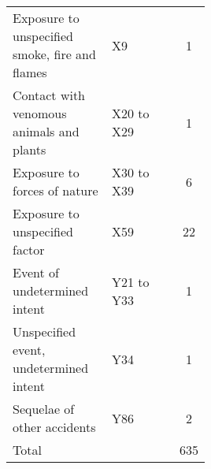 \documentclass[]{article}
\begin{document}
\begin{table}[H]
\begin{tabular}{p{0.5\linewidth}lc}
  Exposure to unspecified smoke, fire and flames & X9 &   1 \\ 
  Contact with venomous animals and plants & X20 to X29 &   1 \\ 
  Exposure to forces of nature & X30 to X39 &   6 \\ 
  Exposure to unspecified factor & X59 &  22 \\ 
  Event of undetermined intent & Y21 to Y33 &   1 \\ 
  Unspecified event, undetermined intent & Y34 &   1 \\ 
  Sequelae of other accidents & Y86 &   2 \\ 
  Total &  & 635 \\ 
   \bottomrule
\end{tabular}
\end{table}
\end{document}
